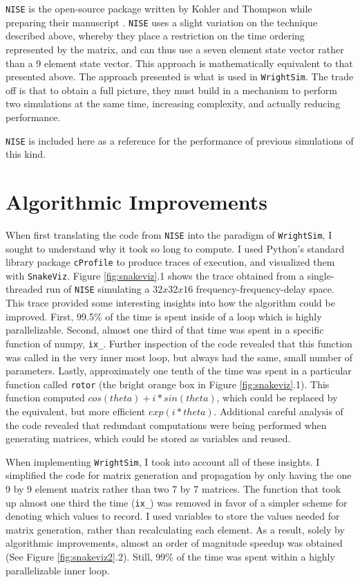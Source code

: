 \documentclass[fontsize=11pt]{scrartcl}
\numberwithin{equation}{section}		%
\numberwithin{figure}{section}			%
\numberwithin{table}{section}				%
\begin{document}
\texttt{NISE} \cite{nise} is the open-source package written by Kohler and Thompson while preparing their manuscript \cite{Kohler_2017}.
\texttt{NISE} uses a slight variation on the technique described above, whereby they place a restriction on the time ordering represented by the matrix, and can thus use a seven element state vector rather than a 9 element state vector.
This approach is mathematically equivalent to that presented above.
The approach presented is what is used in \texttt{WrightSim}.
The trade off is that to obtain a full picture, they must build in a mechanism to perform two simulations at the same time, increasing complexity, and actually reducing performance.

\texttt{NISE} is included here as a reference for the performance of previous simulations of this kind.

\section{Algorithmic Improvements}

When first translating the code from \texttt{NISE} into the paradigm of \texttt{WrightSim}, I sought to understand why it took so long to compute.
I used Python's standard library package \texttt{cProfile} to produce traces of execution, and visualized them with \texttt{SnakeViz}\cite{snakeviz}.
Figure \ref{fig:snakeviz}.1 shows the trace obtained from a single-threaded run of \texttt{NISE} simulating a $32 x 32 x 16$ frequency-frequency-delay space.
This trace provided some interesting insights into how the algorithm could be improved.
First, 99.5\% of the time is spent inside of a loop which is highly parallelizable. 
Second, almost one third of that time was spent in a specific function of numpy, \texttt{ix\_}.
Further inspection of the code revealed that this function was called in the very inner most loop, but always had the same, small number of parameters.
Lastly, approximately one tenth of the time was spent in a particular function called \texttt{rotor} (the bright orange box in Figure \ref{fig:snakeviz}.1).
This function computed $cos(theta) + i * sin(theta)$, which could be replaced by the equivalent, but more efficient $exp(i * theta)$.
Additional careful analysis of the code revealed that redundant computations were being performed when generating matrices, which could be stored as variables and reused.

When implementing \texttt{WrightSim}, I took into account all of these insights.
I simplified the code for matrix generation and propagation by only having the one 9 by 9 element matrix rather than two 7 by 7 matrices.
The function that took up almost one third the time (\texttt{ix\_}) was removed in favor of a simpler scheme for denoting which values to record.
I used variables to store the values needed for matrix generation, rather than recalculating each element.
As a result, solely by algorithmic improvements, almost an order of magnitude speedup was obtained (See Figure \ref{fig:snakeviz2}.2).
Still, 99\% of the time was spent within a highly parallelizable inner loop.
\end{document}

